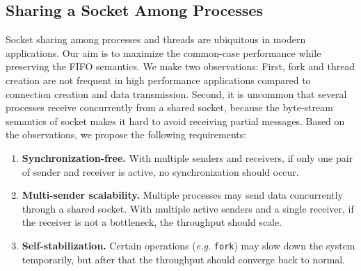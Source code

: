 
\fi




\subsection{Sharing a Socket Among Processes}
\label{subsec:fork}

Socket sharing among processes and threads are ubiquitous in modern applications.
Our aim is to maximize the common-case performance while preserving the FIFO semantics.
We make two observations: First, fork and thread creation are not frequent in high performance applications compared to connection creation and data transmission.
Second, it is uncommon that several processes receive concurrently from a shared socket, because the byte-stream semantics of socket makes it hard to avoid receiving partial messages.
Based on the observations, we propose the following requirements:

\begin{enumerate}
 \item \textbf{Synchronization-free.} With multiple senders and receivers, if only one pair of sender and receiver is active, no synchronization should occur.
 \item \textbf{Multi-sender scalability.} Multiple processes may send data concurrently through a shared socket. With multiple active senders and a single receiver, if the receiver is not a bottleneck, the throughput should scale.
 \item \textbf{Self-stabilization.} Certain operations (\textit{e.g.} \texttt{fork}) may slow down the system temporarily, but after that the throughput should converge back to normal.
\end{enumerate}

